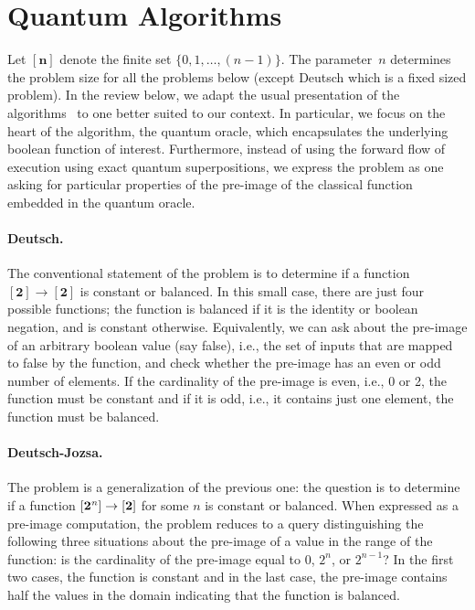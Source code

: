 \documentclass[sigplan,screen]{acmart}
\newcommand{\finset}[1]{[\mathbf{#1}]}
\theoremstyle{definition}
\begin{document}
\section{Quantum Algorithms}
\label{sec3}

Let $\finset{n}$ denote the finite set $\{ 0,1,\ldots,(n-1)\}$. The
parameter~$n$ determines the problem size for all the problems below
(except Deutsch which is a fixed sized problem). In the review below,
we adapt the usual presentation of the
algorithms~\cite{doi:10.1137/S0097539796300921,deutsch,deutschJozsa,365701,doi:10.1137/S0097539795293172,nielsen_chuang_2010,10.1145/237814.237866}
to one better suited to our context. In particular, we focus on the
heart of the algorithm, the quantum oracle, which encapsulates the
underlying boolean function of interest. Furthermore, instead of using
the forward flow of execution using exact quantum superpositions, we
express the problem as one asking for particular properties of the
pre-image of the classical function embedded in the quantum oracle.

\paragraph*{Deutsch.}
The conventional statement of the problem is to determine if a
function $\finset{2} \rightarrow \finset{2}$ is constant or
balanced. In this small case, there are just four possible functions;
the function is balanced if it is the identity or boolean negation,
and is constant otherwise. Equivalently, we can ask about the
pre-image of an arbitrary boolean value (say false), i.e., the set of
inputs that are mapped to false by the function, and check whether the
pre-image has an even or odd number of elements. If the cardinality of
the pre-image is even, i.e., 0 or 2, the function must be constant and
if it is odd, i.e., it contains just one element, the function must be
balanced. 

\paragraph*{Deutsch-Jozsa.}
The problem is a generalization of the previous one: the question is
to determine if a function $\finset{2^{\it n}} \rightarrow \finset{2}$ for
some $n$ is constant or balanced. When expressed as a pre-image
computation, the problem reduces to a query distinguishing the
following three situations about the pre-image of a value in the range
of the function: is the cardinality of the pre-image equal to 0,
$2^n$, or $2^{n-1}$? In the first two cases, the function is constant
and in the last case, the pre-image contains half the values in the
domain indicating that the function is balanced. 
\end{document}
